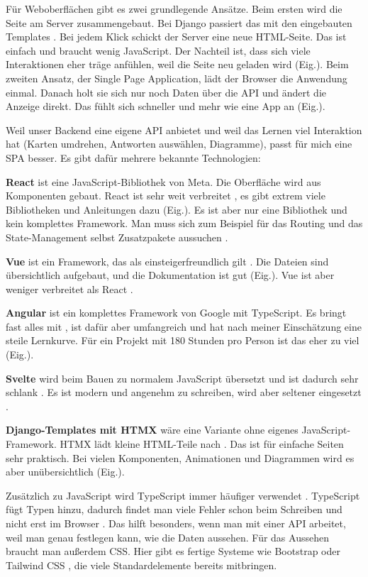 Für Weboberflächen gibt es zwei grundlegende Ansätze. Beim ersten wird die Seite am Server zusammengebaut. Bei Django passiert das mit den eingebauten Templates \parencite{djangoOverview}. Bei jedem Klick schickt der Server eine neue HTML-Seite. Das ist einfach und braucht wenig JavaScript. Der Nachteil ist, dass sich viele Interaktionen eher träge anfühlen, weil die Seite neu geladen wird (Eig.). Beim zweiten Ansatz, der Single Page Application, lädt der Browser die Anwendung einmal. Danach holt sie sich nur noch Daten über die API und ändert die Anzeige direkt. Das fühlt sich schneller und mehr wie eine App an (Eig.).
 
Weil unser Backend eine eigene API anbietet und weil das Lernen viel Interaktion hat (Karten umdrehen, Antworten auswählen, Diagramme), passt für mich eine SPA besser. Es gibt dafür mehrere bekannte Technologien:
 
\textbf{React} ist eine JavaScript-Bibliothek von Meta. Die Oberfläche wird aus Komponenten gebaut. React ist sehr weit verbreitet \parencite{stackoverflow2025}, es gibt extrem viele Bibliotheken und Anleitungen dazu (Eig.). Es ist aber nur eine Bibliothek und kein komplettes Framework. Man muss sich zum Beispiel für das Routing und das State-Management selbst Zusatzpakete aussuchen \parencite{react2026}.
 
\textbf{Vue} ist ein Framework, das als einsteigerfreundlich gilt \parencite{vue2026}. Die Dateien sind übersichtlich aufgebaut, und die Dokumentation ist gut (Eig.). Vue ist aber weniger verbreitet als React \parencite{stackoverflow2025}.
 
\textbf{Angular} ist ein komplettes Framework von Google mit TypeScript. Es bringt fast alles mit \parencite{angular2026}, ist dafür aber umfangreich und hat nach meiner Einschätzung eine steile Lernkurve. Für ein Projekt mit 180 Stunden pro Person ist das eher zu viel (Eig.).
 
\textbf{Svelte} wird beim Bauen zu normalem JavaScript übersetzt und ist dadurch sehr schlank \parencite{svelte2026}. Es ist modern und angenehm zu schreiben, wird aber seltener eingesetzt \parencite{stackoverflow2025}.
 
\textbf{Django-Templates mit HTMX} wäre eine Variante ohne eigenes JavaScript-Framework. HTMX lädt kleine HTML-Teile nach \parencite{htmx2026}. Das ist für einfache Seiten sehr praktisch. Bei vielen Komponenten, Animationen und Diagrammen wird es aber unübersichtlich (Eig.).
 
Zusätzlich zu JavaScript wird TypeScript immer häufiger verwendet \parencite{stateofjs2025}. TypeScript fügt Typen hinzu, dadurch findet man viele Fehler schon beim Schreiben und nicht erst im Browser \parencite{typescript}. Das hilft besonders, wenn man mit einer API arbeitet, weil man genau festlegen kann, wie die Daten aussehen. Für das Aussehen braucht man außerdem CSS. Hier gibt es fertige Systeme wie Bootstrap oder Tailwind CSS \parencite{tailwind}, die viele Standardelemente bereits mitbringen.
 
